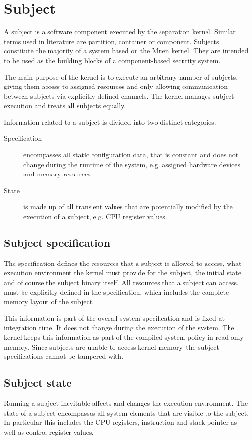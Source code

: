 \section{Subject}\label{sec:design-subject}
A subject is a software component executed by the separation kernel. Similar
terms used in literature are partition, container or component. Subjects
constitute the majority of a system based on the Muen kernel. They are intended
to be used as the building blocks of a component-based security system.

The main purpose of the kernel is to execute an arbitrary number of subjects,
giving them access to assigned resources and only allowing communication between
subjects via explicitly defined channels. The kernel manages subject execution
and treats all subjects equally.

Information related to a subject is divided into two distinct categories:

\begin{description}
	\item[Specification] encompasses all static configuration data, that is
		constant and does not change during the runtime of the system, e.g.
		assigned hardware devices and memory resources.
	\item[State] is made up of all transient values that are potentially
		modified by the execution of a subject, e.g. CPU register values.
\end{description}

\subsection{Subject specification}
The specification defines the resources that a subject is allowed to access,
what execution environment the kernel must provide for the subject, the initial
state and of course the subject binary itself. All resources that a subject can
access, must be explicitly defined in the specification, which includes the
complete memory layout of the subject.

This information is part of the overall system specification and is fixed at
integration time. It does not change during the execution of the system. The
kernel keeps this information as part of the compiled system policy in read-only
memory. Since subjects are unable to access kernel memory, the subject
specifications cannot be tampered with.

\subsection{Subject state}
Running a subject inevitable affects and changes the execution environment. The
state of a subject encompasses all system elements that are visible to the
subject. In particular this includes the CPU registers, instruction and stack
pointer as well as control register values.

